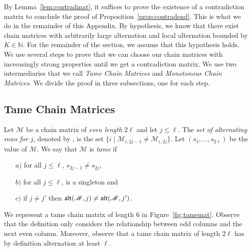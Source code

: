 \documentclass[envcountsame]{llncs}
\newcommand\nat{\ensuremath{\mathbb{N}}\xspace}
\newcommand\mat{\ensuremath{\mathscr{M}}\xspace}
\let\leq\leqslant
\newcommand\chain{chain\xspace}
\newcommand\Chain{Chain\xspace}
\begin{document}
By Lemma~\ref{lem:contradmat}, it suffices to prove the existence of a
contradiction matrix to conclude the proof of
Proposition~\ref{prop:contradend}. This is what we do in the remainder
of this Appendix. By hypothesis, we know that there exist \chain
matrices with arbitrarily large alternation and local alternation
bounded by $K \in \nat$. For the remainder of the section, we assume
that this hypothesis holds. We use several steps to prove that we can
choose our \chain matrices with increasingly strong properties until
we get a contradiction matrix. We use two intermediaries that we 
call \emph{Tame \Chain Matrices} and \emph{Monotonous \Chain
  Matrices}. We divide the proof in three subsections, one for each
step.

\subsection{Tame \Chain Matrices}

Let \mat be a \chain matrix of \emph{even length} $2\ell$ and let $j \leq
\ell$. The \emph{set of alternating rows for $j$}, denoted by
\alt{\mat}{j}, is the set $\{i \mid \mat_{i,2j-1} \neq
\mat_{i,2j}\}$. Let 
$(s_1,\dots,s_{2\ell})$ be the value of \mat. We say that \mat is \emph{tame} if
\begin{itemize}
\item [$a)$] for all $j \leq \ell$, $s_{2j-1} \neq s_{2j}$,
\item [$b)$] for all $j \leq \ell$,
  \alt{\mat}{j} is a singleton and
\item [$c)$] if $j \neq j'$ then $\alt{\mat}{j}
  \neq \alt{\mat}{j'}$.
\end{itemize}
We represent a tame \chain matrix
of length $6$ in Figure~\ref{fig:tamemat}. Observe that the definition
only considers the relationship between odd columns and the next even
column. Moreover, observe that a tame \chain matrix of length $2\ell$
has by definition alternation at least $\ell$.
\end{document}
